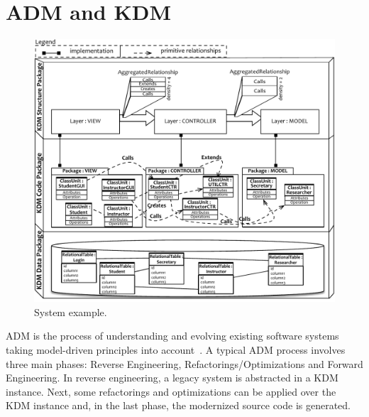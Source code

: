 
\section{ADM and KDM} %
\label{sec:background}
 
\begin{figure}[t]
	\centering
	\includegraphics[scale=0.8]{figuras/NovoSystem3}
	\caption{System example.}
	\label{fig:system}
\end{figure}

ADM is the process of understanding  and evolving existing software systems taking model-driven principles into account~\cite{1686216}. A typical ADM process involves three main phases: Reverse Engineering, Refactorings/Optimizations and Forward Engineering. In reverse engineering, a legacy system is abstracted in a KDM instance. Next, some refactorings and optimizations can be applied over the KDM instance and, in the last phase, the modernized source code is generated. 

